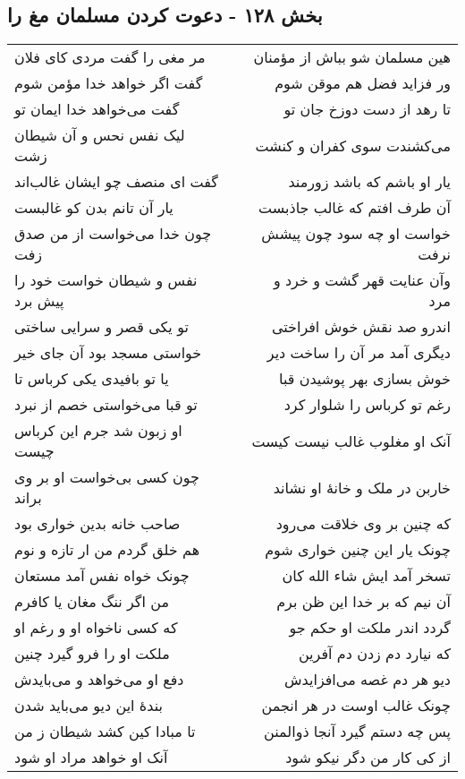 \begin{center}
\section*{بخش ۱۲۸ - دعوت کردن مسلمان مغ را}
\label{sec:sh128}
\begin{longtable}{l p{0.5cm} r}
مر مغی را گفت مردی کای فلان
&&
هین مسلمان شو بباش از مؤمنان
\\
گفت اگر خواهد خدا مؤمن شوم
&&
ور فزاید فضل هم موقن شوم
\\
گفت می‌خواهد خدا ایمان تو
&&
تا رهد از دست دوزخ جان تو
\\
لیک نفس نحس و آن شیطان زشت
&&
می‌کشندت سوی کفران و کنشت
\\
گفت ای منصف چو ایشان غالب‌اند
&&
یار او باشم که باشد زورمند
\\
یار آن تانم بدن کو غالبست
&&
آن طرف افتم که غالب جاذبست
\\
چون خدا می‌خواست از من صدق زفت
&&
خواست او چه سود چون پیشش نرفت
\\
نفس و شیطان خواست خود را پیش برد
&&
وآن عنایت قهر گشت و خرد و مرد
\\
تو یکی قصر و سرایی ساختی
&&
اندرو صد نقش خوش افراختی
\\
خواستی مسجد بود آن جای خیر
&&
دیگری آمد مر آن را ساخت دیر
\\
یا تو بافیدی یکی کرباس تا
&&
خوش بسازی بهر پوشیدن قبا
\\
تو قبا می‌خواستی خصم از نبرد
&&
رغم تو کرباس را شلوار کرد
\\
او زبون شد جرم این کرباس چیست
&&
آنک او مغلوب غالب نیست کیست
\\
چون کسی بی‌خواست او بر وی براند
&&
خاربن در ملک و خانهٔ او نشاند
\\
صاحب خانه بدین خواری بود
&&
که چنین بر وی خلاقت می‌رود
\\
هم خلق گردم من ار تازه و نوم
&&
چونک یار این چنین خواری شوم
\\
چونک خواه نفس آمد مستعان
&&
تسخر آمد ایش شاء الله کان
\\
من اگر ننگ مغان یا کافرم
&&
آن نیم که بر خدا این ظن برم
\\
که کسی ناخواه او و رغم او
&&
گردد اندر ملکت او حکم جو
\\
ملکت او را فرو گیرد چنین
&&
که نیارد دم زدن دم آفرین
\\
دفع او می‌خواهد و می‌بایدش
&&
دیو هر دم غصه می‌افزایدش
\\
بندهٔ این دیو می‌باید شدن
&&
چونک غالب اوست در هر انجمن
\\
تا مبادا کین کشد شیطان ز من
&&
پس چه دستم گیرد آنجا ذوالمنن
\\
آنک او خواهد مراد او شود
&&
از کی کار من دگر نیکو شود
\\
\end{longtable}
\end{center}
